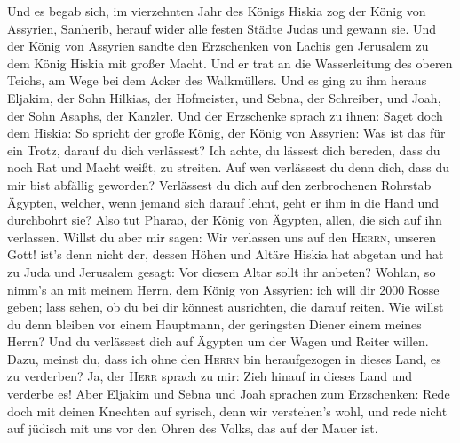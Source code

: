  Und es begab sich, im vierzehnten Jahr des Königs Hiskia
zog der König von Assyrien, Sanherib, herauf wider alle festen Städte
Judas und gewann sie.  Und der König von Assyrien sandte
den Erzschenken von Lachis gen Jerusalem zu dem König Hiskia mit großer
Macht. Und er trat an die Wasserleitung des oberen Teichs, am Wege bei
dem Acker des Walkmüllers.  Und es ging zu ihm heraus
Eljakim, der Sohn Hilkias, der Hofmeister, und Sebna, der Schreiber, und
Joah, der Sohn Asaphs, der Kanzler.  Und der Erzschenke
sprach zu ihnen: Saget doch dem Hiskia: So spricht der große König, der
König von Assyrien: Was ist das für ein Trotz, darauf du dich
verlässest?  Ich achte, du lässest dich bereden, dass du
noch Rat und Macht weißt, zu streiten. Auf wen verlässest du denn dich,
dass du mir bist abfällig geworden?  Verlässest du dich
auf den zerbrochenen Rohrstab Ägypten, welcher, wenn jemand sich darauf
lehnt, geht er ihm in die Hand und durchbohrt sie? Also tut Pharao, der
König von Ägypten, allen, die sich auf ihn verlassen. 
Willst du aber mir sagen: Wir verlassen uns auf den \textsc{Herrn},
unseren Gott! ist's denn nicht der, dessen Höhen und Altäre Hiskia hat
abgetan und hat zu Juda und Jerusalem gesagt: Vor diesem Altar sollt ihr
anbeten?  Wohlan, so nimm's an mit meinem Herrn, dem König
von Assyrien: ich will dir 2000 Rosse geben; lass sehen, ob du bei dir
könnest ausrichten, die darauf reiten.  Wie willst du denn
bleiben vor einem Hauptmann, der geringsten Diener einem meines Herrn?
Und du verlässest dich auf Ägypten um der Wagen und Reiter willen.
 Dazu, meinst du, dass ich ohne den \textsc{Herrn} bin
heraufgezogen in dieses Land, es zu verderben? Ja, der \textsc{Herr}
sprach zu mir: Zieh hinauf in dieses Land und verderbe es!
 Aber Eljakim und Sebna und Joah sprachen zum
Erzschenken: Rede doch mit deinen Knechten auf syrisch, denn wir
verstehen's wohl, und rede nicht auf jüdisch mit uns vor den Ohren des
Volks, das auf der Mauer ist.

